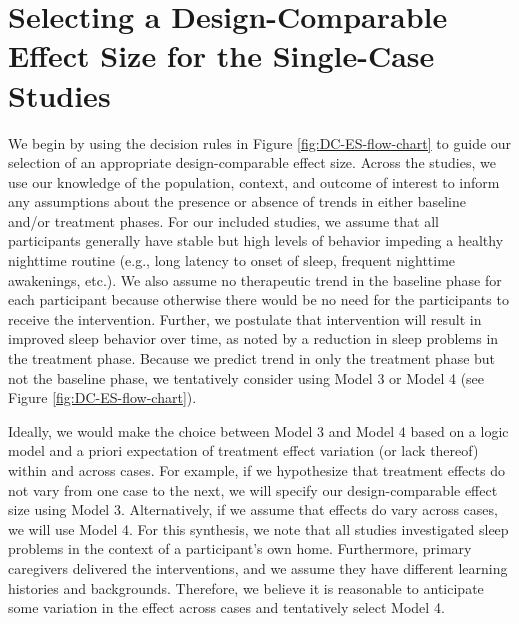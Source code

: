 \documentclass[
]{book}
\begin{document}
\hypertarget{selecting-a-design-comparable-effect-size-for-the-single-case-studies-1}{%
\section{Selecting a Design-Comparable Effect Size for the Single-Case Studies}\label{selecting-a-design-comparable-effect-size-for-the-single-case-studies-1}}

We begin by using the decision rules in Figure \ref{fig:DC-ES-flow-chart} to guide our selection of an appropriate design-comparable effect size. Across the studies, we use our knowledge of the population, context, and outcome of interest to inform any assumptions about the presence or absence of trends in either baseline and/or treatment phases. For our included studies, we assume that all participants generally have stable but high levels of behavior impeding a healthy nighttime routine (e.g., long latency to onset of sleep, frequent nighttime awakenings, etc.). We also assume no therapeutic trend in the baseline phase for each participant because otherwise there would be no need for the participants to receive the intervention. Further, we postulate that intervention will result in improved sleep behavior over time, as noted by a reduction in sleep problems in the treatment phase. Because we predict trend in only the treatment phase but not the baseline phase, we tentatively consider using Model 3 or Model 4 (see Figure \ref{fig:DC-ES-flow-chart}).

Ideally, we would make the choice between Model 3 and Model 4 based on a logic model and a priori expectation of treatment effect variation (or lack thereof) within and across cases. For example, if we hypothesize that treatment effects do not vary from one case to the next, we will specify our design-comparable effect size using Model 3. Alternatively, if we assume that effects do vary across cases, we will use Model 4. For this synthesis, we note that all studies investigated sleep problems in the context of a participant's own home. Furthermore, primary caregivers delivered the interventions, and we assume they have different learning histories and backgrounds. Therefore, we believe it is reasonable to anticipate some variation in the effect across cases and tentatively select Model 4.
\end{document}
